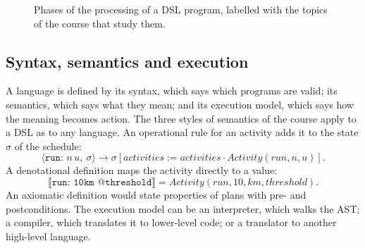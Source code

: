 \begin{figure}[h]
\centering
{}
\caption{Phases of the processing of a DSL program, labelled with the topics of the course that study them.}
\label{fig:pipeline}
\end{figure}

\subsection{Syntax, semantics and execution}

A language is defined by its syntax, which says which programs are valid; its
semantics, which says what they mean; and its execution model, which says how
the meaning becomes action. The three styles of semantics of the course apply
to a DSL as to any language. An operational rule for an activity adds it to
the state $\sigma$ of the schedule:
\[
  \langle \texttt{run: } n\,u,\ \sigma \rangle \to
  \sigma[\mathit{activities} := \mathit{activities} \cdot \mathit{Activity}(\mathit{run}, n, u)].
\]
A denotational definition maps the activity directly to a value:
\[
  \llbracket \texttt{run: 10km @threshold} \rrbracket =
  \mathit{Activity}(\mathit{run}, 10, \mathit{km}, \mathit{threshold}).
\]
An axiomatic definition would state properties of plans with pre- and
postconditions. The execution model can be an interpreter, which walks the
AST; a compiler, which translates it to lower-level code; or a translator to
another high-level language.

